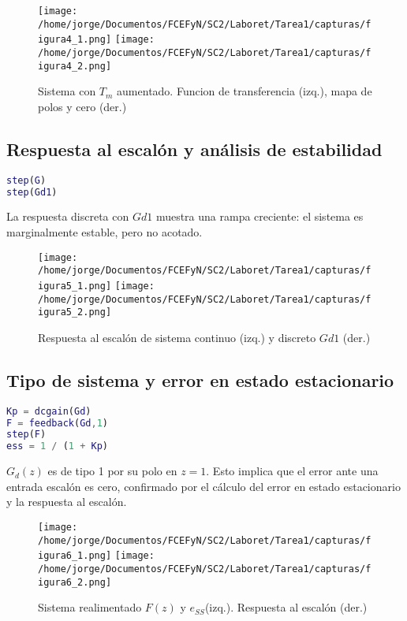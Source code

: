 \documentclass[11pt]{article}
\begin{document}
\begin{figure}[h!]
    \centering
    \texttt{[image: /home/jorge/Documentos/FCEFyN/SC2/Laboret/Tarea1/capturas/figura4\_1.png]}
    \texttt{[image: /home/jorge/Documentos/FCEFyN/SC2/Laboret/Tarea1/capturas/figura4\_2.png]}
    \caption{Sistema con \(T_m\) aumentado. Funcion de transferencia (izq.), mapa de polos y cero (der.)}
\end{figure}

\subsection{Respuesta al escalón y análisis de estabilidad}
\begin{lstlisting}[language=Matlab]
step(G)
step(Gd1)
\end{lstlisting}

La respuesta discreta con \(Gd1\) muestra una rampa creciente: el sistema es marginalmente estable, pero no acotado.

\begin{figure}[h!]
    \centering
    \texttt{[image: /home/jorge/Documentos/FCEFyN/SC2/Laboret/Tarea1/capturas/figura5\_1.png]}
    \texttt{[image: /home/jorge/Documentos/FCEFyN/SC2/Laboret/Tarea1/capturas/figura5\_2.png]}
    \caption{Respuesta al escalón de sistema continuo (izq.) y discreto \(Gd1\) (der.)}
\end{figure}

\newpage

\subsection{Tipo de sistema y error en estado estacionario}
\begin{lstlisting}[language=Matlab]
Kp = dcgain(Gd)
F = feedback(Gd,1)
step(F)
ess = 1 / (1 + Kp)
\end{lstlisting}

\(G_d(z)\) es de tipo 1 por su polo en \(z = 1\). Esto implica que el error ante una entrada escalón es cero, confirmado por el cálculo del error en estado estacionario y la respuesta al escalón.

\begin{figure}[h!]
    \centering
    \texttt{[image: /home/jorge/Documentos/FCEFyN/SC2/Laboret/Tarea1/capturas/figura6\_1.png]}
    \texttt{[image: /home/jorge/Documentos/FCEFyN/SC2/Laboret/Tarea1/capturas/figura6\_2.png]}
    \caption{Sistema realimentado \(F(z)\) y \(e_{SS}\)(izq.). Respuesta al escalón (der.) }
\end{figure}
\end{document}
